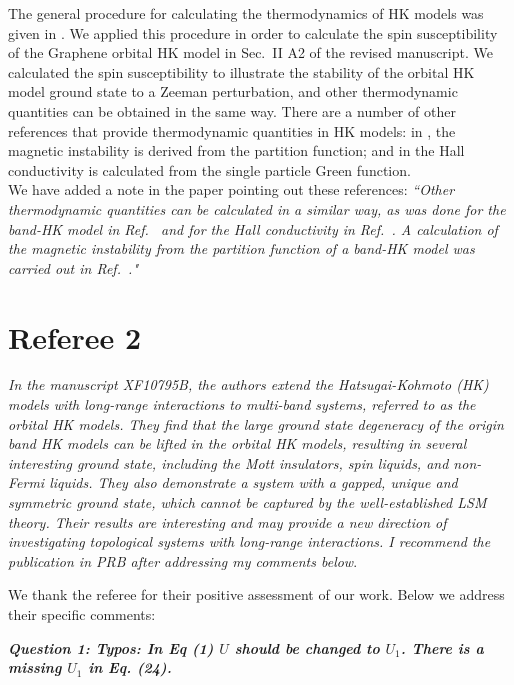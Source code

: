 \documentclass[aps,reprint,notitlepage,onecolumn,12pt]{revtex4-2}
\numberwithin{equation}{section}
\begin{document}
The general procedure for calculating the thermodynamics of HK models was given in \cite{2022PhilipHKsuperconductor}. 
We applied this procedure in order to calculate the spin susceptibility of the Graphene orbital HK model in Sec.~II A2 of the revised manuscript.
We calculated the spin susceptibility to illustrate the stability of the orbital HK model ground state to a Zeeman perturbation, and other thermodynamic quantities can be obtained in the same way. 
There are a number of other references that provide thermodynamic quantities in HK models: in \cite{zhao2023updated}, the magnetic instability is derived from the partition function; and in \cite{zhao2023failure} the Hall conductivity is calculated from the single particle Green function.\\

\indent We have added a note in the paper pointing out these references:
\textit{``Other thermodynamic quantities can be calculated in a similar way, as was done for the band-HK model in Ref.~\cite{zhao2021determination} and for the Hall conductivity in Ref.~\cite{zhao2023failure}. A calculation of the magnetic instability from the partition function of a band-HK model was carried out in Ref.~\cite{zhao2023updated}."}



\section{Referee 2}
\textit{In the manuscript XF10795B, the authors extend the Hatsugai-Kohmoto
(HK) models with long-range interactions to multi-band systems,
referred to as the orbital HK models. 
They find that the large ground state degeneracy of the origin band HK models can be lifted in the orbital HK models, resulting in several interesting ground state, including the Mott insulators, spin liquids, and non-Fermi liquids. They also demonstrate a system with a gapped, unique and symmetric ground state, which cannot be captured by the well-established LSM
theory. Their results are interesting and may provide a new direction
of investigating topological systems with long-range interactions. 
I recommend the publication in PRB after addressing my comments below}.

We thank the referee for their positive assessment of our work. Below we address their specific comments:

\textbf{\textit{Question 1: Typos: In Eq (1) $U$ should be changed to $U_1$. There is a missing $U_1$ in Eq. (24).}}\\
\end{document}
